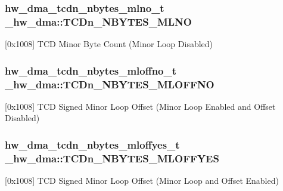 \subsubsection[{\texorpdfstring{T\+C\+Dn\+\_\+\+N\+B\+Y\+T\+E\+S\+\_\+\+M\+L\+NO}{TCDn_NBYTES_MLNO}}]{ {\bf hw\+\_\+dma\+\_\+tcdn\+\_\+nbytes\+\_\+mlno\+\_\+t} \+\_\+hw\+\_\+dma\+::\+T\+C\+Dn\+\_\+\+N\+B\+Y\+T\+E\+S\+\_\+\+M\+L\+NO}\hypertarget{struct__hw__dma_af52fa369552c946d55899f5ee873bba3}{}\label{struct__hw__dma_af52fa369552c946d55899f5ee873bba3}
\mbox{[}0x1008\mbox{]} T\+CD Minor Byte Count (Minor Loop Disabled) 
\subsubsection[{\texorpdfstring{T\+C\+Dn\+\_\+\+N\+B\+Y\+T\+E\+S\+\_\+\+M\+L\+O\+F\+F\+NO}{TCDn_NBYTES_MLOFFNO}}]{ {\bf hw\+\_\+dma\+\_\+tcdn\+\_\+nbytes\+\_\+mloffno\+\_\+t} \+\_\+hw\+\_\+dma\+::\+T\+C\+Dn\+\_\+\+N\+B\+Y\+T\+E\+S\+\_\+\+M\+L\+O\+F\+F\+NO}\hypertarget{struct__hw__dma_ad5386d1a4617e61bb08041eadcb0dfe4}{}\label{struct__hw__dma_ad5386d1a4617e61bb08041eadcb0dfe4}
\mbox{[}0x1008\mbox{]} T\+CD Signed Minor Loop Offset (Minor Loop Enabled and Offset Disabled) 
\subsubsection[{\texorpdfstring{T\+C\+Dn\+\_\+\+N\+B\+Y\+T\+E\+S\+\_\+\+M\+L\+O\+F\+F\+Y\+ES}{TCDn_NBYTES_MLOFFYES}}]{ {\bf hw\+\_\+dma\+\_\+tcdn\+\_\+nbytes\+\_\+mloffyes\+\_\+t} \+\_\+hw\+\_\+dma\+::\+T\+C\+Dn\+\_\+\+N\+B\+Y\+T\+E\+S\+\_\+\+M\+L\+O\+F\+F\+Y\+ES}\hypertarget{struct__hw__dma_acd53d5b5d684dc74a2b43d2666df5c15}{}\label{struct__hw__dma_acd53d5b5d684dc74a2b43d2666df5c15}
\mbox{[}0x1008\mbox{]} T\+CD Signed Minor Loop Offset (Minor Loop and Offset Enabled) 
